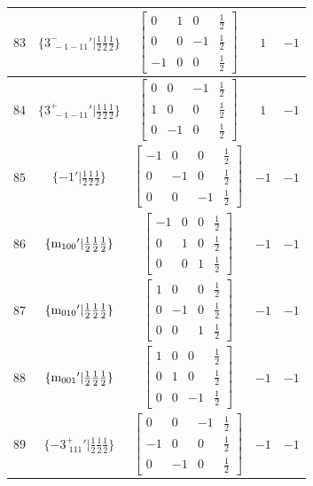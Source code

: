 \documentclass[fleqn,8pt]{jsarticle}
\begin{document}
\begin{longtable}{ccccc}
$ 83 $ & $ \{3^{-}_{\,\,-1-11}{}'|\frac{1}{2} \frac{1}{2} \frac{1}{2}\} $ & $ \begin{bmatrix} 0 & 1 & 0 & \frac{1}{2} \\ 0 & 0 & -1 & \frac{1}{2} \\ -1 & 0 & 0 & \frac{1}{2} \end{bmatrix} $ & $ 1 $ & $ -1 $ \\ \hline
$ 84 $ & $ \{3^{+}_{\,\,-1-11}{}'|\frac{1}{2} \frac{1}{2} \frac{1}{2}\} $ & $ \begin{bmatrix} 0 & 0 & -1 & \frac{1}{2} \\ 1 & 0 & 0 & \frac{1}{2} \\ 0 & -1 & 0 & \frac{1}{2} \end{bmatrix} $ & $ 1 $ & $ -1 $ \\ \hline
$ 85 $ & $ \{-1{}'|\frac{1}{2} \frac{1}{2} \frac{1}{2}\} $ & $ \begin{bmatrix} -1 & 0 & 0 & \frac{1}{2} \\ 0 & -1 & 0 & \frac{1}{2} \\ 0 & 0 & -1 & \frac{1}{2} \end{bmatrix} $ & $ -1 $ & $ -1 $ \\ \hline
$ 86 $ & $ \{{\rm m}_{100}{}'|\frac{1}{2} \frac{1}{2} \frac{1}{2}\} $ & $ \begin{bmatrix} -1 & 0 & 0 & \frac{1}{2} \\ 0 & 1 & 0 & \frac{1}{2} \\ 0 & 0 & 1 & \frac{1}{2} \end{bmatrix} $ & $ -1 $ & $ -1 $ \\ \hline
$ 87 $ & $ \{{\rm m}_{010}{}'|\frac{1}{2} \frac{1}{2} \frac{1}{2}\} $ & $ \begin{bmatrix} 1 & 0 & 0 & \frac{1}{2} \\ 0 & -1 & 0 & \frac{1}{2} \\ 0 & 0 & 1 & \frac{1}{2} \end{bmatrix} $ & $ -1 $ & $ -1 $ \\ \hline
$ 88 $ & $ \{{\rm m}_{001}{}'|\frac{1}{2} \frac{1}{2} \frac{1}{2}\} $ & $ \begin{bmatrix} 1 & 0 & 0 & \frac{1}{2} \\ 0 & 1 & 0 & \frac{1}{2} \\ 0 & 0 & -1 & \frac{1}{2} \end{bmatrix} $ & $ -1 $ & $ -1 $ \\ \hline
$ 89 $ & $ \{-3^{+}_{\,\,111}{}'|\frac{1}{2} \frac{1}{2} \frac{1}{2}\} $ & $ \begin{bmatrix} 0 & 0 & -1 & \frac{1}{2} \\ -1 & 0 & 0 & \frac{1}{2} \\ 0 & -1 & 0 & \frac{1}{2} \end{bmatrix} $ & $ -1 $ & $ -1 $ \\ \hline

\end{longtable}
\end{document}
